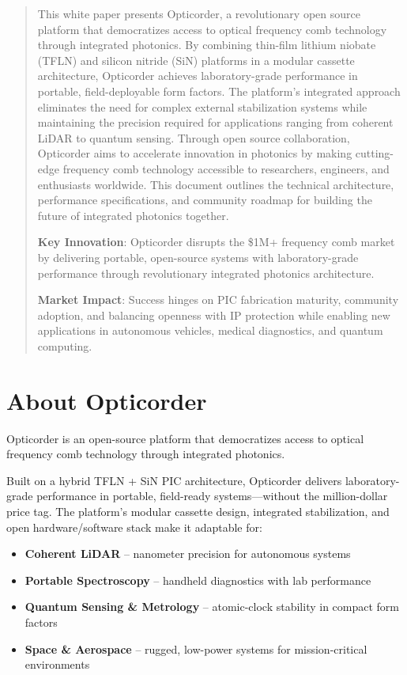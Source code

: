 \documentclass[11pt,a4paper]{article}
\begin{document}
\begin{abstract}
\noindent
This white paper presents Opticorder, a revolutionary open source platform that democratizes access to optical frequency comb technology through integrated photonics. By combining thin-film lithium niobate (TFLN) and silicon nitride (SiN) platforms in a modular cassette architecture, Opticorder achieves laboratory-grade performance in portable, field-deployable form factors. The platform's integrated approach eliminates the need for complex external stabilization systems while maintaining the precision required for applications ranging from coherent LiDAR to quantum sensing. Through open source collaboration, Opticorder aims to accelerate innovation in photonics by making cutting-edge frequency comb technology accessible to researchers, engineers, and enthusiasts worldwide. This document outlines the technical architecture, performance specifications, and community roadmap for building the future of integrated photonics together.

\textbf{Key Innovation}: Opticorder disrupts the \$1M+ frequency comb market by delivering portable, open-source systems with laboratory-grade performance through revolutionary integrated photonics architecture.

\textbf{Market Impact}: Success hinges on PIC fabrication maturity, community adoption, and balancing openness with IP protection while enabling new applications in autonomous vehicles, medical diagnostics, and quantum computing.
\end{abstract}

\section*{About Opticorder}

Opticorder is an open-source platform that democratizes access to optical frequency comb technology through integrated photonics.

Built on a hybrid TFLN + SiN PIC architecture, Opticorder delivers laboratory-grade performance in portable, field-ready systems---without the million-dollar price tag. The platform's modular cassette design, integrated stabilization, and open hardware/software stack make it adaptable for:

\begin{itemize}
\item \textbf{Coherent LiDAR} -- nanometer precision for autonomous systems
\item \textbf{Portable Spectroscopy} -- handheld diagnostics with lab performance  
\item \textbf{Quantum Sensing \& Metrology} -- atomic-clock stability in compact form factors
\item \textbf{Space \& Aerospace} -- rugged, low-power systems for mission-critical environments
\end{itemize}
\end{document}
